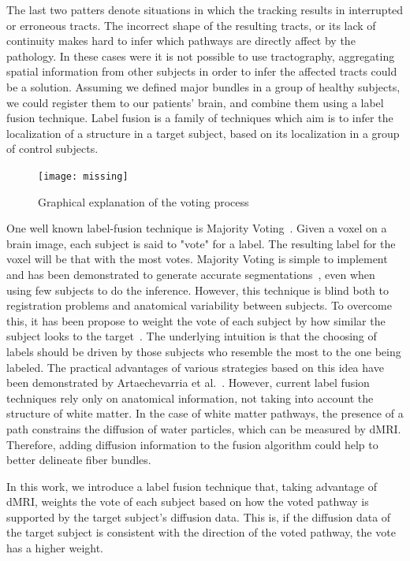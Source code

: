 The last two patters denote situations in which the tracking results in interrupted or erroneous
tracts. The incorrect shape of the resulting tracts, or its lack of continuity
makes hard to infer which pathways are directly affect by the pathology. In these
cases were it is not possible to use tractography, aggregating spatial information
from other subjects in order to infer the affected tracts could be a solution.
Assuming we defined major bundles in a group of healthy subjects, we could
register them to our patients' brain, and combine them using a label fusion
technique. Label fusion is a family of techniques which aim is to infer the
localization of a structure in a target subject, based on its
localization in a group of control subjects\cite{Asman2013}.

\begin{figure}[t]
    \texttt{[image: missing]}
    \caption{Graphical explanation of the voting process}
    \label{fig:weighted_diffusion}
\end{figure}

One well known label-fusion technique is Majority Voting~\cite{Xu1992}. Given a
voxel on a brain image, each subject is said to "vote" for a label. The resulting
label for the voxel will be that with the most votes. Majority Voting is simple to
implement and has been demonstrated to generate accurate segmentations~\cite{Asman2013},
even when using few subjects to do the inference. However, this technique is blind
both to registration problems and anatomical variability between subjects. To
overcome this, it has been propose
to weight the vote of each subject by how similar the subject looks to the
target~\cite{Sabuncu2010}. The underlying intuition is that the choosing of labels
should be driven by those subjects who resemble the most to the one being labeled.
The practical advantages of various strategies based on this idea have been
demonstrated by Artaechevarria et al.~\cite{Artaechevarria2009}. However, current
label fusion techniques rely only on anatomical information, not taking 
into account the structure of white matter. In the case of white matter pathways,
the presence of a path constrains the diffusion of water particles, which can be
measured by dMRI. Therefore, adding diffusion information to the fusion algorithm
could help to better delineate fiber bundles.

In this work, we introduce a label fusion technique that, taking advantage of dMRI,
weights the vote of each subject based on how the voted pathway is supported by the
target subject's diffusion data. This is, if the diffusion data of the target subject
is consistent with the direction of the voted pathway, the vote has a higher weight.

